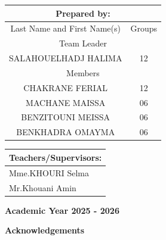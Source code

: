 \documentclass[12pt]{article}
\begin{document}
\begin{minipage}{0.5\textwidth}
\centering
   \begin{table}[H]
    \centering
    \begin{tabular}{|c|c|}
        \hline
        \multicolumn{2}{|c|}{Prepared by:}  \\
        \hline
         Last Name and First Name(s) & Groups   \\
        \hline
        \multicolumn{2}{|c|}{Team Leader}  \\
        \hline
        SALAHOUELHADJ HALIMA  & 12 \\
        \hline
        \multicolumn{2}{|c|}{Members}   \\
        \hline
         CHAKRANE FERIAL & 12 \\
        \hline
         MACHANE MAISSA & 06\\
        \hline
         BENZITOUNI MEISSA & 06 \\
        \hline
         BENKHADRA OMAYMA & 06 \\
        \hline
\end{tabular} 
\end{table}
\end{minipage}
\begin{minipage}{0.5\textwidth}
\centering
    \begin{table}[H]
    \centering
    \begin{tabular}{|p{7cm}|}
        \hline
        Teachers/Supervisors: \\
        \hline
        Mme.KHOURI Selma  \\
        \hline
        Mr.Khouani Amin  \\
        \hline
\end{tabular} 
\end{table}

\end{minipage}

\vspace{1cm}
\begin{center}
    \textbf{\large Academic Year 2025 - 2026}
\end{center}
    
\newpage
\begin{center}

     \textbf{\Huge Acknowledgements}

\end{center}

\vspace{0.5cm}
\end{document}
